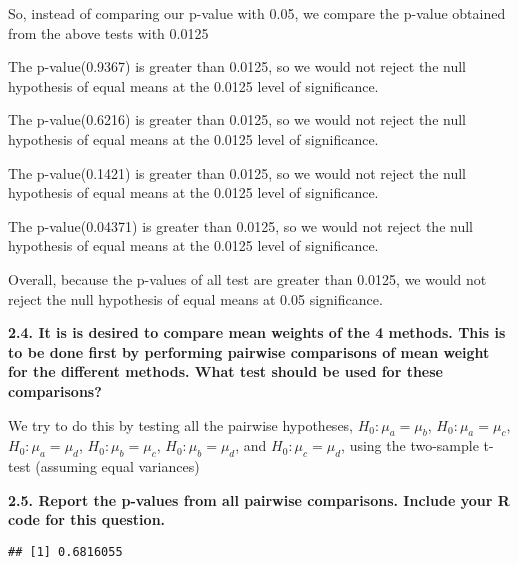 \documentclass[
]{article}
\newenvironment{Shaded}{\begin{snugshade}}{\end{snugshade}}
\newcommand{\AttributeTok}[1]{\textcolor[rgb]{0.77,0.63,0.00}{#1}}
\newcommand{\FunctionTok}[1]{\textcolor[rgb]{0.00,0.00,0.00}{#1}}
\newcommand{\NormalTok}[1]{#1}
\newcommand{\OtherTok}[1]{\textcolor[rgb]{0.56,0.35,0.01}{#1}}
\newcommand{\SpecialCharTok}[1]{\textcolor[rgb]{0.00,0.00,0.00}{#1}}
\newcommand{\StringTok}[1]{\textcolor[rgb]{0.31,0.60,0.02}{#1}}
\begin{document}
So, instead of comparing our p-value with 0.05, we compare the p-value
obtained from the above tests with 0.0125

The p-value(0.9367) is greater than 0.0125, so we would not reject the
null hypothesis of equal means at the 0.0125 level of significance.

The p-value(0.6216) is greater than 0.0125, so we would not reject the
null hypothesis of equal means at the 0.0125 level of significance.

The p-value(0.1421) is greater than 0.0125, so we would not reject the
null hypothesis of equal means at the 0.0125 level of significance.

The p-value(0.04371) is greater than 0.0125, so we would not reject the
null hypothesis of equal means at the 0.0125 level of significance.

Overall, because the p-values of all test are greater than 0.0125, we
would not reject the null hypothesis of equal means at 0.05
significance.

\textbf{2.4. It is is desired to compare mean weights of the 4 methods.
This is to be done first by performing pairwise comparisons of mean
weight for the different methods. What test should be used for these
comparisons?}

We try to do this by testing all the pairwise hypotheses,
\(H_0:\mu_a=\mu_b\), \(H_0:\mu_a=\mu_c\), \(H_0:\mu_a=\mu_d\),
\(H_0:\mu_b=\mu_c\), \(H_0:\mu_b=\mu_d\), and \(H_0:\mu_c=\mu_d\), using
the two-sample t-test (assuming equal variances)

\textbf{2.5. Report the p-values from all pairwise comparisons. Include
your R code for this question.}

\begin{Shaded}
\end{Shaded}

\begin{verbatim}
## [1] 0.6816055
\end{verbatim}
\end{document}
